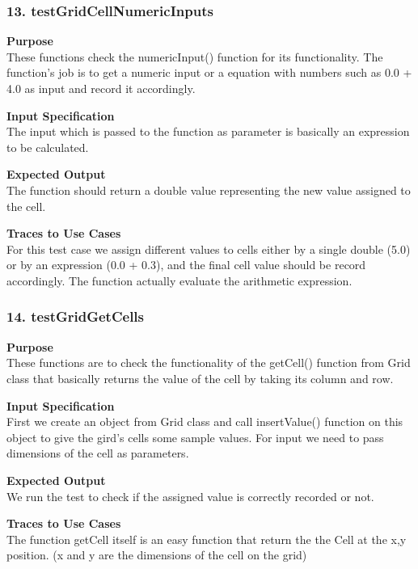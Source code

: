 \documentclass[12pt]{article}
\begin{document}
\subsubsection{13. testGridCellNumericInputs} \label{tc:1}

\noindent
{\bf Purpose}\\
These functions check the numericInput() function for its functionality. The function’s job is to get a numeric input or a equation with numbers such as 0.0 + 4.0 as input and record it accordingly. 

\noindent
{\bf Input Specification}\\
The input which is passed to the function as parameter is basically an expression to be calculated.

\noindent
{\bf Expected Output}\\
The function should return a double value representing the new value assigned to the cell.

\noindent
{\bf Traces to Use Cases}\\
For this test case we assign different values to cells either by a single double (5.0) or by an expression (0.0 + 0.3), and the final cell value should be record accordingly. The function actually evaluate the arithmetic expression. 
\subsubsection{14. testGridGetCells} \label{tc:1}

\noindent
{\bf Purpose}\\
These functions are to check the functionality of the getCell() function from Grid class that basically returns the value of the cell by taking its column and row.

\noindent
{\bf Input Specification}\\
First we create an object from Grid class and call insertValue() function on this object to give the gird’s cells some sample values. For input we need to pass dimensions of the cell as parameters. 

\noindent
{\bf Expected Output}\\
We run the test to check if the assigned value is correctly recorded or not.

\noindent
{\bf Traces to Use Cases}\\
The function getCell itself is an easy function that return the the Cell at the x,y position. (x and y are the dimensions of the cell on the grid)
\end{document}
